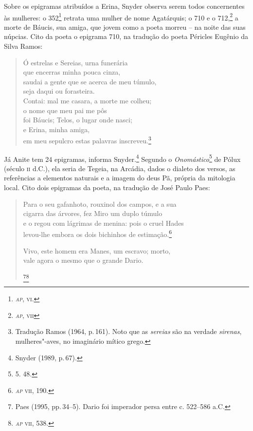 Sobre os epigramas atribuídos a Erina, Snyder observa
serem todos concernentes às mulheres: o 352\footnote{\textit{\textsc{ap}}, \textsc{vi}.}
retrata uma mulher de nome Agatárquis; o 710 e o 712,\footnote{\textit{\textsc{ap}}, \textsc{vii}} a morte de 
Báucis, sua amiga, que jovem como a poeta morreu -- na noite das suas núpcias.
Cito da poeta o epigrama 710, na tradução do poeta Péricles Eugênio da Silva Ramos:

\begin{verse}
\small{Ó estrelas e Sereias, urna funerária\\ 
\quad que encerras minha pouca cinza,\\
saudai a gente que se acerca de meu túmulo,\\
\quad seja daqui ou forasteira.\\
Contai: mal me casara, a morte me colheu;\\
\quad o nome que meu pai me pôs\\
foi Báucis; Telos, o lugar onde nasci;\\
\quad e Erina, minha amiga,\\
em meu sepulcro estas palavras inscreveu.}\footnote{Tradução Ramos (1964, p.\,161). Noto que as \textit{sereias} são na verdade \textit{sirenas}, mulheres"-aves, no imaginário mítico grego.}
\end{verse}

Já Anite tem 24 
epigramas, informa Snyder.\footnote{ Snyder (1989, p.\,67).} Segundo o \textit{Onomástico}\footnote{5. 48.} de
Pólux (século \textsc{ii} d.C.), ela seria de Tegeia, na Arcádia, dados o dialeto dos
versos, as referências a elementos naturais e a imagem do deus Pã, própria da
mitologia local. Cito dois epigramas da poeta, na tradução de José Paulo Paes:

\begin{verse}
\small{Para o seu gafanhoto, rouxinol dos campos, e a sua\\
cigarra das árvores, fez Miro um duplo túmulo\\
e o regou com lágrimas de menina: pois o cruel Hades\\
levou-lhe embora os dois bichinhos de estimação.\footnote{\textit{\textsc{ap}} \textsc{vii}, 190.}

Vivo, este homem era Manes, um escravo; morto,\\
vale agora o mesmo que o grande Dario.}\footnote{Paes (1995, pp.\,34--5). Dario foi imperador persa entre c. 522--586 a.C.}\footnote{\textit{\textsc{ap}} \textsc{vii}, 538.}
\end{verse}

